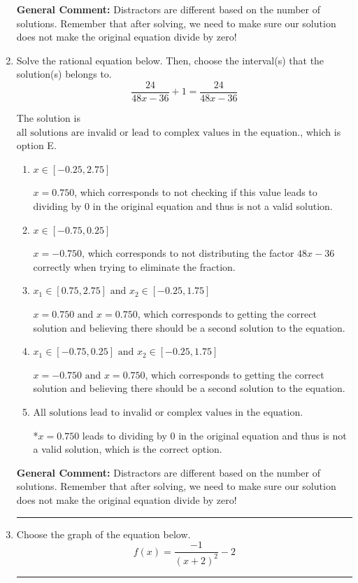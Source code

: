 \documentclass{extbook}[14pt]
\newcommand{\litem}[1]{\item #1

\rule{\textwidth}{0.4pt}}
\begin{document}
\begin{enumerate}
{\textbf{General Comment:} Distractors are different based on the number of solutions. Remember that after solving, we need to make sure our solution does not make the original equation divide by zero!
}
\litem{
Solve the rational equation below. Then, choose the interval(s) that the solution(s) belongs to.
\[ \frac{24}{48x -36} + 1 = \frac{24}{48x -36} \]

The solution is \( \text{all solutions are invalid or lead to complex values in the equation.} \), which is option E.\begin{enumerate}[label=\Alph*.]
\item \( x \in [-0.25,2.75] \)

$x = 0.750$, which corresponds to not checking if this value leads to dividing by 0 in the original equation and thus is not a valid solution.
\item \( x \in [-0.75,0.25] \)

$x = -0.750$, which corresponds to not distributing the factor $48x -36$ correctly when trying to eliminate the fraction.
\item \( x_1 \in [0.75, 2.75] \text{ and } x_2 \in [-0.25,1.75] \)

$x = 0.750 \text{ and } x = 0.750$, which corresponds to getting the correct solution and believing there should be a second solution to the equation.
\item \( x_1 \in [-0.75, 0.25] \text{ and } x_2 \in [-0.25,1.75] \)

$x = -0.750 \text{ and } x = 0.750$, which corresponds to getting the correct solution and believing there should be a second solution to the equation.
\item \( \text{All solutions lead to invalid or complex values in the equation.} \)

*$x = 0.750$ leads to dividing by 0 in the original equation and thus is not a valid solution, which is the correct option.
\end{enumerate}

\textbf{General Comment:} Distractors are different based on the number of solutions. Remember that after solving, we need to make sure our solution does not make the original equation divide by zero!
}
\litem{
Choose the graph of the equation below.
\[ f(x) = \frac{-1}{(x + 2)^2} - 2 \]

}
\end{enumerate}
\end{document}
